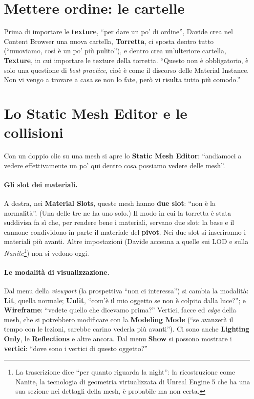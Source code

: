 \section{Mettere ordine: le cartelle}
\label{ue3:sec:cartelle}

Prima di importare le \textbf{texture}, ``per dare un po' di ordine'', Davide crea nel
Content Browser una nuova cartella, \textbf{Torretta}, ci sposta dentro tutto
(``muoviamo, così è un po' più pulito''), e dentro crea un'ulteriore cartella,
\textbf{Texture}, in cui importare le texture della torretta. ``Questo non è
obbligatorio, è solo una questione di \emph{best practice}, cioè è come il discorso
delle Material Instance. Non vi vengo a trovare a casa se non lo fate, però vi risulta
tutto più comodo.''

\section{Lo Static Mesh Editor e le collisioni}
\label{ue3:sec:sme}

Con un doppio clic su una mesh si apre lo \textbf{Static Mesh Editor}: ``andiamoci a
vedere effettivamente un po' qui dentro cosa possiamo vedere delle mesh''.

\paragraph{Gli slot dei materiali.} A destra, nei \textbf{Material Slots}, queste mesh
hanno \textbf{due slot}: ``non è la normalità''. (Una delle tre ne ha uno solo.) Il modo
in cui la torretta è stata suddivisa fa sì che, per rendere bene i materiali, servano
due slot: la base e il cannone condividono in parte il materiale del \textbf{pivot}. Nei
due slot si inseriranno i materiali più avanti. Altre impostazioni (Davide accenna a
quelle sui LOD e sulla \emph{Nanite}\footnote{La trascrizione dice ``per quanto riguarda
la night'': la ricostruzione come Nanite, la tecnologia di geometria virtualizzata di
Unreal Engine 5 che ha una sua sezione nei dettagli della mesh, è probabile ma non
certa.}) non si vedono oggi.

\paragraph{Le modalità di visualizzazione.} Dal menu della \emph{viewport} (la
prospettiva ``non ci interessa'') si cambia la modalità: \textbf{Lit}, quella normale;
\textbf{Unlit}, ``com'è il mio oggetto se non è colpito dalla luce?''; e
\textbf{Wireframe}: ``vedete quello che dicevamo prima?'' Vertici, facce ed \emph{edge}
della mesh, che si potrebbero modificare con la \textbf{Modeling Mode} (``se avanzerà
il tempo con le lezioni, sarebbe carino vederla più avanti''). Ci sono anche
\textbf{Lighting Only}, le \textbf{Reflections} e altre ancora. Dal menu \textbf{Show}
si possono mostrare i \textbf{vertici}: ``dove sono i vertici di questo oggetto?''

